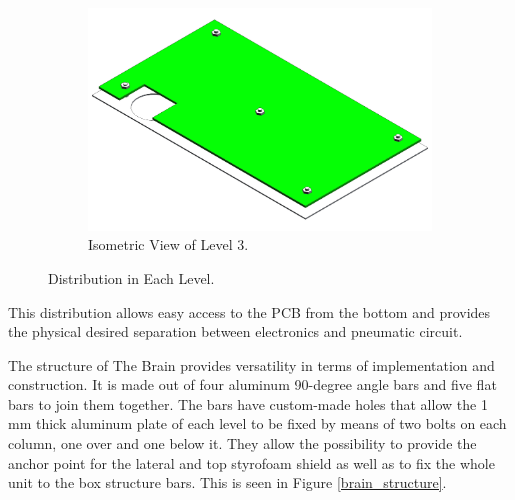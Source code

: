 \begin{figure}[H]
\begin{subfigure}[b]{0.3\textwidth}
    \centering
    \includegraphics[width=\textwidth]{4-experiment-design/img/Mechanical/Level_3.png}
    \caption{Isometric View of Level 3.}
    \label{level_3}
    \end{subfigure}
    \caption{Distribution in Each Level.}
    \label{fig:The-brain}
\end{figure}

This distribution allows easy access to the PCB from the bottom and provides the physical desired separation between electronics and pneumatic circuit.


\smallskip
The structure of The Brain provides versatility in terms of implementation and construction. It is made out of four aluminum 90-degree angle bars and five flat bars to join them together. The bars have custom-made holes that allow the 1 mm thick aluminum plate of each level to be fixed by means of two bolts on each column, one over and one below it. They allow the possibility to provide the anchor point for the lateral and top styrofoam shield as well as to fix the whole unit to the box structure bars. This is seen in Figure \ref{brain_structure}. 

